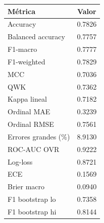 \begin{tabular}{lc}
\toprule
Métrica & Valor \\
\midrule
Accuracy & 0.7826 \\
Balanced accuracy & 0.7757 \\
F1-macro & 0.7777 \\
F1-weighted & 0.7829 \\
MCC & 0.7036 \\
QWK & 0.7362 \\
Kappa lineal & 0.7182 \\
Ordinal MAE & 0.3239 \\
Ordinal RMSE & 0.7561 \\
Errores grandes (\%) & 8.9130 \\
ROC-AUC OVR & 0.9222 \\
Log-loss & 0.8721 \\
ECE & 0.1569 \\
Brier macro & 0.0940 \\
F1 bootstrap lo & 0.7358 \\
F1 bootstrap hi & 0.8144 \\
\bottomrule
\end{tabular}
